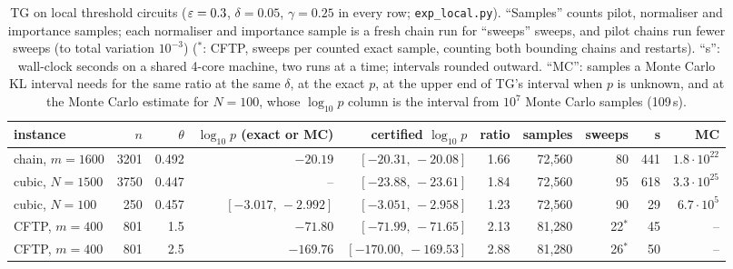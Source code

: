 \begin{table}[ht]
\centering\scriptsize
\setlength{\tabcolsep}{3.5pt}\begin{tabular}{@{}lrrrrrrrrr@{}}
\toprule
instance & $n$ & $\theta$ & $\log_{10}p$ (exact or MC) & certified $\log_{10}p$ & ratio & samples & sweeps & s & MC\\
\midrule
chain, $m=1600$ & 3201 & 0.492 & $-20.19$ & $[-20.31,\,-20.08]$ & 1.66 & 72{,}560 & 80 & 441 & $1.8\cdot10^{22}$\\
cubic, $N=1500$ & 3750 & 0.447 & -- & $[-23.88,\,-23.61]$ & 1.84 & 72{,}560 & 95 & 618 & $3.3\cdot10^{25}$\\
cubic, $N=100$ & 250 & 0.457 & $[-3.017,\,-2.992]$ & $[-3.051,\,-2.958]$ & 1.23 & 72{,}560 & 90 & 29 & $6.7\cdot10^{5}$\\
CFTP, $m=400$ & 801 & 1.5 & $-71.80$ & $[-71.99,\,-71.65]$ & 2.13 & 81{,}280 & 22$^*$ & 45 & --\\
CFTP, $m=400$ & 801 & 2.5 & $-169.76$ & $[-170.00,\,-169.53]$ & 2.88 & 81{,}280 & 26$^*$ & 50 & --\\
\bottomrule
\end{tabular}
\caption{TG on local threshold circuits ($\varepsilon=0.3$, $\delta=0.05$, $\gamma=0.25$ in every row; \texttt{exp\_local.py}). ``Samples'' counts pilot, normaliser and importance samples; each normaliser and importance sample is a fresh chain run for ``sweeps'' sweeps, and pilot chains run fewer sweeps (to total variation $10^{-3}$) ($^*$: CFTP, sweeps per counted exact sample, counting both bounding chains and restarts). ``s'': wall-clock seconds on a shared 4-core machine, two runs at a time; intervals rounded outward. ``MC'': samples a Monte Carlo KL interval needs for the same ratio at the same $\delta$, at the exact $p$, at the upper end of TG's interval when $p$ is unknown, and at the Monte Carlo estimate for $N=100$, whose $\log_{10}p$ column is the interval from $10^7$ Monte Carlo samples (109\,s).}
\label{tab:local}
\end{table}
